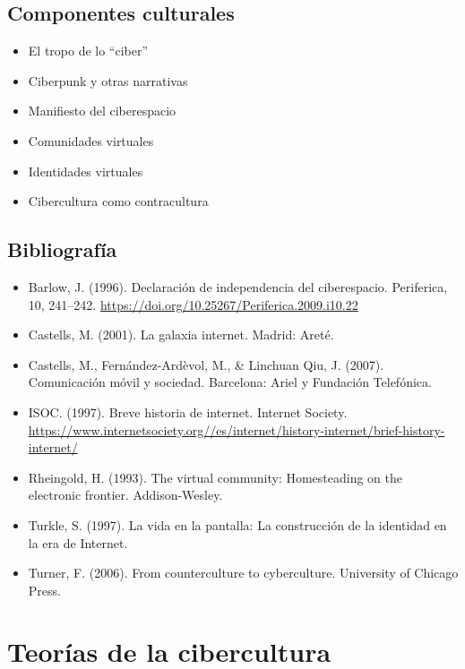 \documentclass[]{book}
\providecommand{\tightlist}{%
  \setlength{\itemsep}{0pt}\setlength{\parskip}{0pt}}
\begin{document}
\hypertarget{componentes-culturales}{%
\section{Componentes culturales}\label{componentes-culturales}}

\begin{itemize}
\tightlist
\item
  El tropo de lo ``ciber''
\item
  Ciberpunk y otras narrativas
\item
  Manifiesto del ciberespacio
\item
  Comunidades virtuales
\item
  Identidades virtuales
\item
  Cibercultura como contracultura
\end{itemize}

\hypertarget{bibliografuxeda}{%
\section*{Bibliografía}\label{bibliografuxeda}}

\begin{itemize}
\tightlist
\item
  Barlow, J. (1996). Declaración de independencia del ciberespacio. Periferica, 10, 241--242. \url{https://doi.org/10.25267/Periferica.2009.i10.22}
\item
  Castells, M. (2001). La galaxia internet. Madrid: Areté.
\item
  Castells, M., Fernández-Ardèvol, M., \& Linchuan Qiu, J. (2007). Comunicación móvil y sociedad. Barcelona: Ariel y Fundación Telefónica.
\item
  ISOC. (1997). Breve historia de internet. Internet Society. \url{https://www.internetsociety.org//es/internet/history-internet/brief-history-internet/}
\item
  Rheingold, H. (1993). The virtual community: Homesteading on the electronic frontier. Addison-Wesley.
\item
  Turkle, S. (1997). La vida en la pantalla: La construcción de la identidad en la era de Internet.
\item
  Turner, F. (2006). From counterculture to cyberculture. University of Chicago Press.
\end{itemize}

\hypertarget{teoruxedas-de-la-cibercultura}{%
\chapter{Teorías de la cibercultura}\label{teoruxedas-de-la-cibercultura}}
\end{document}
